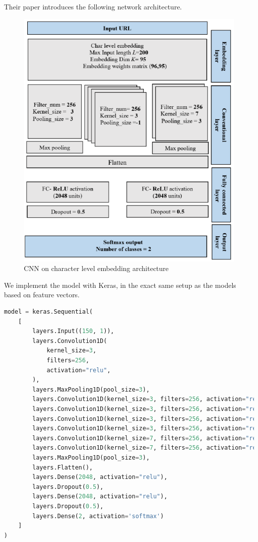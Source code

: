 \documentclass{article}
\begin{document}
    Their paper introduces the following network architecture.
    \begin{figure}[H]
        \centering
        \includegraphics[width=0.8\linewidth]{report_img/cnn_configuration}
        \caption{CNN on character level embedding architecture~\cite{CharacterLevelCNN}}
        \label{fig:CNN}
    \end{figure}

    We implement the model with Keras, in the exact same setup as the models based on feature vectors.

    \begin{lstlisting}[language=Python, caption=CNN on character level embedding]
model = keras.Sequential(
    [
        layers.Input((150, 1)),
        layers.Convolution1D(
            kernel_size=3,
            filters=256,
            activation="relu",
        ),
        layers.MaxPooling1D(pool_size=3),
        layers.Convolution1D(kernel_size=3, filters=256, activation="relu"),
        layers.Convolution1D(kernel_size=3, filters=256, activation="relu"),
        layers.Convolution1D(kernel_size=3, filters=256, activation="relu"),
        layers.Convolution1D(kernel_size=3, filters=256, activation="relu"),
        layers.Convolution1D(kernel_size=7, filters=256, activation="relu"),
        layers.Convolution1D(kernel_size=7, filters=256, activation="relu"),
        layers.MaxPooling1D(pool_size=3),
        layers.Flatten(),
        layers.Dense(2048, activation="relu"),
        layers.Dropout(0.5),
        layers.Dense(2048, activation="relu"),
        layers.Dropout(0.5),
        layers.Dense(2, activation='softmax')
    ]
)
    \end{lstlisting}
\end{document}
